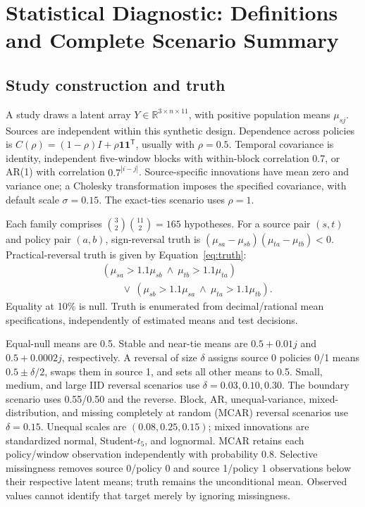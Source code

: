 \section{Statistical Diagnostic: Definitions and Complete Scenario Summary}\label{app:stat}
\subsection{Study construction and truth}
A study draws a latent array $Y\in\mathbb{R}^{3\times n\times11}$, with
positive population means $\mu_{sj}$. Sources are independent within this
synthetic design. Dependence across policies is
$C(\rho)=(1-\rho)I+\rho\mathbf{1}\mathbf{1}^{\mathsf T}$, usually with
$\rho=0.5$. Temporal covariance is identity, independent five-window blocks
with within-block correlation 0.7, or AR(1) with correlation $0.7^{|i-j|}$.
Source-specific innovations have mean zero and variance one; a Cholesky
transformation imposes the specified covariance, with default scale
$\sigma=0.15$. The exact-ties scenario uses $\rho=1$.

Each family comprises $\binom{3}{2}\binom{11}{2}=165$ hypotheses.
For a source pair $(s,t)$ and policy pair $(a,b)$, sign-reversal truth is
$(\mu_{sa}-\mu_{sb})(\mu_{ta}-\mu_{tb})<0$. Practical-reversal truth is given by Equation~\ref{eq:truth}:
\begin{equation}\label{eq:truth}
\begin{aligned}
 &(\mu_{sa}>1.1\mu_{sb}\ \land\ \mu_{tb}>1.1\mu_{ta})\\
 &\qquad\lor\ (\mu_{sb}>1.1\mu_{sa}\ \land\ \mu_{ta}>1.1\mu_{tb}).
\end{aligned}
\end{equation}
Equality at 10\% is null. Truth is enumerated from decimal/rational mean
specifications, independently of estimated means and test decisions.

Equal-null means are 0.5. Stable and near-tie means are $0.5+0.01j$ and
$0.5+0.0002j$, respectively. A reversal of size $\delta$ assigns source 0
policies 0/1 means $0.5\pm\delta/2$, swaps them in source 1, and sets all
other means to 0.5. Small, medium, and large IID reversal scenarios use
$\delta=0.03,0.10,0.30$. The boundary scenario uses 0.55/0.50 and the reverse.
Block, AR, unequal-variance, mixed-distribution, and missing completely at random (MCAR) reversal scenarios
use $\delta=0.15$. Unequal scales are $(0.08,0.25,0.15)$; mixed innovations
are standardized normal, Student-$t_5$, and lognormal. MCAR retains each
policy/window observation independently with probability 0.8. Selective
missingness removes source 0/policy 0 and source 1/policy 1 observations
below their respective latent means; truth remains the unconditional mean.
Observed values cannot identify that target merely by ignoring missingness.

